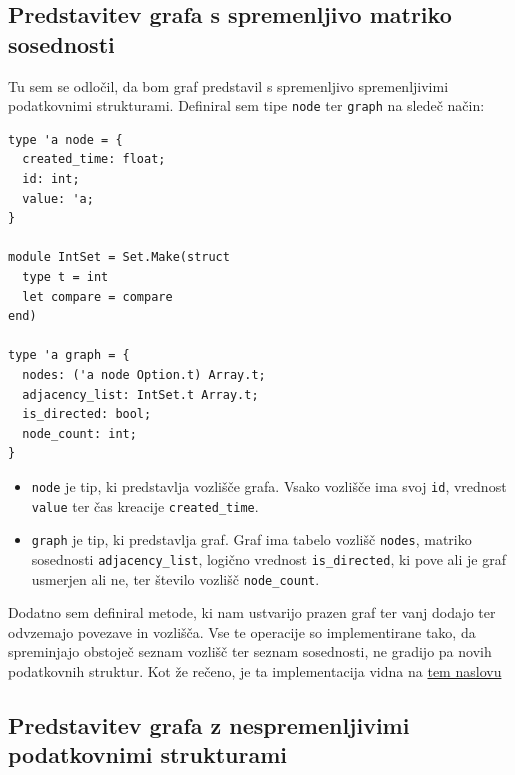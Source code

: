 \documentclass[mat1, tisk]{fmfdelo}
\begin{document}
\subsection{Predstavitev grafa s spremenljivo matriko sosednosti} \label{sec:predstavitev_grafa_s_spremenljivo_matriko_sosednosti}

Tu sem se odločil, da bom graf predstavil s spremenljivo spremenljivimi podatkovnimi strukturami. Definiral sem tipe \texttt{node} ter \texttt{graph} na sledeč način:

\begin{lstlisting}
type 'a node = {
  created_time: float;
  id: int;
  value: 'a;
}

module IntSet = Set.Make(struct
  type t = int
  let compare = compare
end)

type 'a graph = {
  nodes: ('a node Option.t) Array.t;
  adjacency_list: IntSet.t Array.t;
  is_directed: bool;
  node_count: int;
}
\end{lstlisting}

\begin{itemize}
  \item \texttt{node} je tip, ki predstavlja vozlišče grafa. Vsako vozlišče ima svoj \texttt{id}, vrednost \texttt{value} ter čas kreacije \texttt{created\_time}.
  \item \texttt{graph} je tip, ki predstavlja graf. Graf ima tabelo vozlišč \texttt{nodes}, matriko sosednosti \texttt{adjacency\_list}, 
        logično vrednost \texttt{is\_directed}, ki pove ali je graf usmerjen ali ne, ter število vozlišč \texttt{node\_count}.
\end{itemize}

Dodatno sem definiral metode, ki nam ustvarijo prazen graf ter vanj dodajo ter odvzemajo povezave in vozlišča. Vse te operacije so implementirane tako, da spreminjajo obstoječ seznam
vozlišč ter seznam sosednosti, ne gradijo pa novih podatkovnih struktur. Kot že rečeno, je ta implementacija vidna na 
\href{https://github.com/tjazerzen/parallelisation-of-graph-algorithms-in-functional-programming-languages/blob/predstavitev_grafa_z_arrayi_ter_mnozicami/playground/graph/graph.ml}{tem naslovu}

\subsection{Predstavitev grafa z nespremenljivimi podatkovnimi strukturami} \label{sec:predstavitev_grafa_z_nespremenljivimi_podatkovnimi_strukturami}
\end{document}
